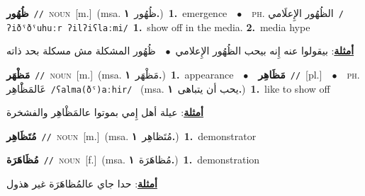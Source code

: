 \documentclass[10pt,a4paper,twoside]{article} %
\begin{document}
\begin{multicols}{2}
{{{{{{\setlength\topsep{0pt}\textbf{\foreignlanguage{arabic}{ظُهُور}}\ {\color{gray}\texttt{//}\color{black}}\ \textsc{noun}\ [m.]\ \color{gray}(msa. \foreignlanguage{arabic}{ظُهُور}~\foreignlanguage{arabic}{\textbf{١.}})\color{black}\ \textbf{1.}~emergence\ \ $\bullet$\ \ \textsc{ph.} \color{gray} \foreignlanguage{arabic}{الظُهُور الإِعلَامي}\color{black}\ {\color{gray}\texttt{/{\sffamily ʔiðˤðˤuhuːr ʔilʔiʕlaːmi}/}\color{black}}\ \textbf{1.}~show off in the media.  \textbf{2.}~media hype\  \begin{flushright}\color{gray}\foreignlanguage{arabic}{\textbf{\underline{\foreignlanguage{arabic}{أمثلة}}}: بيقولوا عنه إِنه بيحب الظُهُور الإِعلامي\ $\bullet$\ \  ظُهُور المشكلة مش مسكلة بحد ذاته}\end{flushright}\color{black}} \vspace{2mm}

{\setlength\topsep{0pt}\textbf{\foreignlanguage{arabic}{مَظْهَر}}\ {\color{gray}\texttt{//}\color{black}}\ \textsc{noun}\ [m.]\ \color{gray}(msa. \foreignlanguage{arabic}{مَظْهَر}~\foreignlanguage{arabic}{\textbf{١.}})\color{black}\ \textbf{1.}~appearance\ \ $\bullet$\ \ \setlength\topsep{0pt}\textbf{\foreignlanguage{arabic}{مَظَاهِر}}\ {\color{gray}\texttt{//}\color{black}}\ [pl.]\ \ $\bullet$\ \ \textsc{ph.} \color{gray} \foreignlanguage{arabic}{عَالمَظَْاهِر}\color{black}\ {\color{gray}\texttt{/{\sffamily ʕalma(ðˤ)aːhir}/}\color{black}}\ \color{gray} (msa. \foreignlanguage{arabic}{يحب أن يتباهى}~\foreignlanguage{arabic}{\textbf{١.}})\color{black}\ \textbf{1.}~like to show off\  \begin{flushright}\color{gray}\foreignlanguage{arabic}{\textbf{\underline{\foreignlanguage{arabic}{أمثلة}}}: عيلة أهل إِمي بموتوا عالمَظْاهِر والفشخرة}\end{flushright}\color{black}} \vspace{2mm}

{\setlength\topsep{0pt}\textbf{\foreignlanguage{arabic}{مُتَظَاهِر}}\ {\color{gray}\texttt{//}\color{black}}\ \textsc{noun}\ [m.]\ \color{gray}(msa. \foreignlanguage{arabic}{مُتَظاهِر}~\foreignlanguage{arabic}{\textbf{١.}})\color{black}\ \textbf{1.}~demonstrator\ 

{\setlength\topsep{0pt}\textbf{\foreignlanguage{arabic}{مُظَاهَرَة}}\ {\color{gray}\texttt{//}\color{black}}\ \textsc{noun}\ [f.]\ \color{gray}(msa. \foreignlanguage{arabic}{مُظاهَرَة}~\foreignlanguage{arabic}{\textbf{١.}})\color{black}\ \textbf{1.}~demonstration\  \begin{flushright}\color{gray}\foreignlanguage{arabic}{\textbf{\underline{\foreignlanguage{arabic}{أمثلة}}}: حدا جاي عالمُظاهَرَة غير هذول}\end{flushright}\color{black}} \vspace{2mm}

}}}}}}
\end{multicols}
\end{document}
